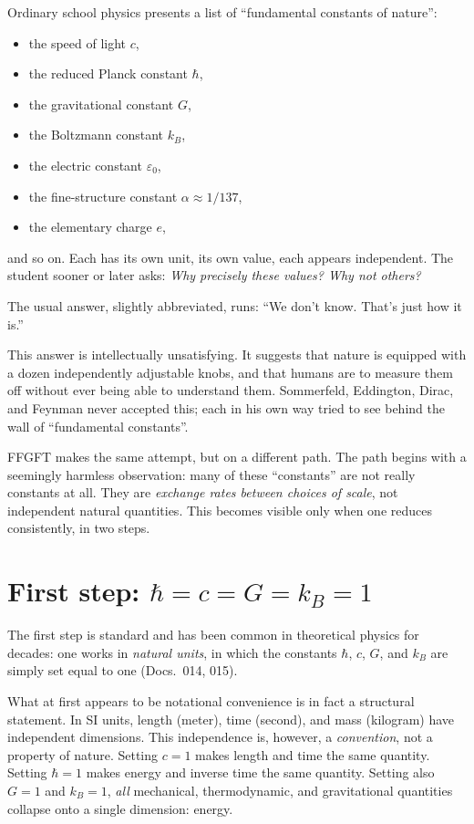 Ordinary school physics presents a list of ``fundamental constants of
nature'':
\begin{itemize}\setlength\itemsep{0pt}
  \item the speed of light $c$,
  \item the reduced Planck constant $\hbar$,
  \item the gravitational constant $G$,
  \item the Boltzmann constant $k_B$,
  \item the electric constant $\varepsilon_0$,
  \item the fine-structure constant $\alpha \approx 1/137$,
  \item the elementary charge $e$,
\end{itemize}
and so on. Each has its own unit, its own value, each appears
independent. The student sooner or later asks: \emph{Why precisely
these values? Why not others?}

The usual answer, slightly abbreviated, runs: ``We don't know. That's
just how it is.''

This answer is intellectually unsatisfying. It suggests that nature is
equipped with a dozen independently adjustable knobs, and that humans
are to measure them off without ever being able to understand them.
Sommerfeld, Eddington, Dirac, and Feynman never accepted this; each
in his own way tried to see behind the wall of ``fundamental constants''.

FFGFT makes the same attempt, but on a different path. The path begins
with a seemingly harmless observation: many of these ``constants'' are
not really constants at all. They are \emph{exchange rates between
choices of scale}, not independent natural quantities. This becomes
visible only when one reduces consistently, in two steps.

\section{First step: $\hbar = c = G = k_B = 1$}

The first step is standard and has been common in theoretical physics
for decades: one works in \emph{natural units}, in which the constants
$\hbar$, $c$, $G$, and $k_B$ are simply set equal to one (Docs.~014,
015).

What at first appears to be notational convenience is in fact a
structural statement. In SI units, length (meter), time (second), and
mass (kilogram) have independent dimensions. This independence is,
however, a \emph{convention}, not a property of nature. Setting $c = 1$
makes length and time the same quantity. Setting $\hbar = 1$ makes
energy and inverse time the same quantity. Setting also $G = 1$ and
$k_B = 1$, \emph{all} mechanical, thermodynamic, and gravitational
quantities collapse onto a single dimension: energy.

